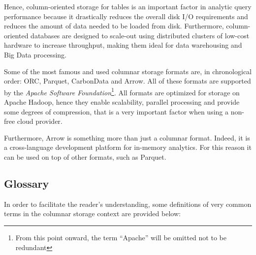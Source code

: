 \documentclass[10pt, a4paper]{report}
\begin{document}
Hence, column-oriented storage for tables is an important factor in analytic query performance because it drastically reduces the overall disk I/O requirements and reduces the amount of data needed to be loaded from disk.
Furthermore, column-oriented databases are designed to scale-out using distributed clusters of low-cost hardware to increase throughput, making them ideal for data warehousing and Big Data processing.

Some of the most famous and used columnar storage formats are, in chronological order: ORC, Parquet, CarbonData and Arrow. All of these formats are supported by the \textit{Apache Software Foundation}\footnote{From this point onward, the term ``Apache'' will be omitted not to be redundant}. All formats are optimized for storage on Apache Hadoop, hence they enable scalability, parallel processing and provide some degrees of compression, that is a very important factor when using a non-free cloud provider.

Furthermore, Arrow is something more than just a columnar format. Indeed, it is a cross-language development platform for in-memory analytics\cite{arrow_homepage}. For this reason it can be used on top of other formats, such as Parquet.

\subsection{Glossary}

In order to facilitate the reader's understanding, some definitions of very common terms in the columnar storage context are provided below: \\
\end{document}
